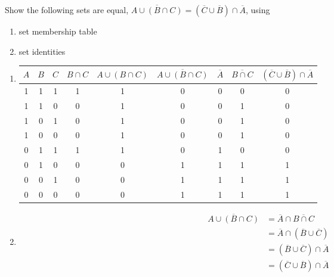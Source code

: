 \begin{questions}
 Show the following sets are equal,  $\overline{A \cup (B \cap C)} = (\overline{C} \cup
    \overline{B}) \cap \overline{A}$, using
\begin{enumerate}[label=(\alph*),itemsep=0pt,parsep=0pt,
        topsep=0pt,partopsep=0pt]
    \item set membership table
    \item set identities
\end{enumerate}
	\ifprintanswers
        \vspace{-10pt}
    \fi
    \begin{solution}
    	\begin{enumerate}[label=(\alph*),itemsep=0pt,parsep=0pt,
        topsep=0pt,partopsep=0pt]
       	\item 
        \scriptsize
       	\begin{tabular}{|ccc|ccc|ccc|}
       		$A$ & $B$ & $C$ & $B \cap C$ & $A \cup (B \cap C)$ & $\overline{A \cup (B \cap C)}$ & 
       		  $\overline{A}$ & $\overline{B \cap C}$ &  $(\overline{C} \cup
    \overline{B}) \cap \overline{A}$ \\
       		\hline
       		 1 & 1 & 1 &  1 & 1 & 0 &   0 & 0 & 0  \\
       		 1 & 1 & 0 &  0 & 1 & 0 &   0 & 1 & 0  \\
       		 1 & 0 & 1 &  0 & 1 & 0 &   0 & 1 & 0  \\
       		 1 & 0 & 0 &  0 & 1 & 0 &   0 & 1 & 0  \\
       		\hline
       		 0 & 1 & 1 &  1 & 1 & 0 &   1 & 0 & 0  \\
       		 0 & 1 & 0 &  0 & 0 & 1 &   1 & 1 & 1  \\
       		 0 & 0 & 1 &  0 & 0 & 1 &   1 & 1 & 1  \\
       		 0 & 0 & 0 &  0 & 0 & 1 &   1 & 1 & 1  \\
       		\hline
       	\end{tabular}

        \normalsize
       	\item 
       	\begin{align*}
		    \overline{A \cup (B \cap C)} &= \overline{A} \cap \overline{B \cap C} \tag{DeMorgan's set identities} \\
		      &= \overline{A} \cap (\overline{B} \cup \overline{C}) \tag{DeMorgan's set identities} \\
		      &= (\overline{B} \cup \overline{C}) \cap \overline{A} \tag{Commutative} \\
		      &= (\overline{C} \cup \overline{B}) \cap \overline{A} \tag{Commutative}
		\end{align*}
	\end{enumerate}
    \end{solution}



\end{questions}
